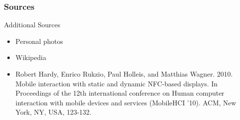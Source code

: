 \documentclass[unknownkeysallowed]{beamer}
\begin{document}
\begin{frame}
  \frametitle{Sources}
  \begin{block}{Additional Sources}
    \begin{itemize}
      \item{Personal photos
      }
      \item{Wikipedia}
      \item{Robert Hardy, Enrico Rukzio, Paul Holleis, and Matthias Wagner. 2010. Mobile interaction with static and dynamic NFC-based displays. In Proceedings of the 12th international conference on Human computer interaction with mobile devices and services (MobileHCI '10). ACM, New York, NY, USA, 123-132. %
      }
    \end{itemize}
  \end{block}
\end{frame}


\end{document}
